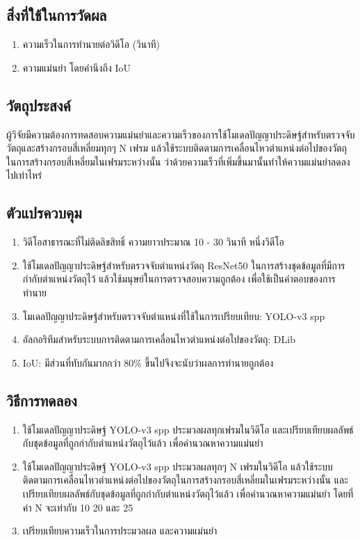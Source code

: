 \subsection*{สิ่งที่ใช้ในการวัดผล}
	\begin{enumerate}
		\setlength\itemsep{-0.25em}
		\item ความเร็วในการทำนายต่อวิดีโอ (วินาที)
		\item ความแม่นยำ โดยคำนึงถึง IoU
	\end{enumerate}
\subsection*{วัตถุประสงค์}
ผู้วิจัยมีความต้องการทดสอบความแม่นยำและความเร็วของการใช้โมเดลปัญญาประดิษฐ์สำหรับตรวจจับวัตถุและสร้างกรอบสี่เหลี่ยมทุกๆ N เฟรม 
แล้วใช้ระบบติดตามการเคลื่อนไหวตำแหน่งต่อไปของวัตถุในการสร้างกรอบสี่เหลี่ยมในเฟรมระหว่างนั้น ว่าด้วยความเร็วที่เพิ่มขึ้นมานั้นทำให้ความแม่นยำลดลงไปเท่าไหร่
\subsection*{ตัวแปรควบคุม}
	\begin{enumerate}
		\setlength\itemsep{-0.25em}
		\item วิดีโอสาธารณะที่ไม่ติดลิขสิทธิ์ ความยาวประมาณ 10 - 30 วินาที หนึ่งวิดีโอ
		\item ใช้โมเดลปัญญาประดิษฐ์สำหรับตรวจจับตำแหน่งวัตถุ ResNet50 ในการสร้างชุดข้อมูลที่มีการกำกับตำแหน่งวัตถุไว้ แล้วใช้มนุษย์ในการตรวจสอบความถูกต้อง
		เพื่อใช้เป็นคำตอบของการทำนาย
		\item โมเดลปัญญาประดิษฐ์สำหรับตรวจจับตำแหน่งที่ใช้ในการเปรียบเทียบ: YOLO-v3 spp
		\item อัลกอริทึมสำหรับระบบการติดตามการเคลื่อนไหวตำแหน่งต่อไปของวัตถุ: DLib
		\item IoU: มีส่วนที่ทับกันมากกว่า 80\% ขึ้นไปจึงจะนับว่าผลการทำนายถูกต้อง
	\end{enumerate}
\subsection*{วิธีการทดลอง}
	\begin{enumerate}
		\setlength\itemsep{-0.25em}
		\item ใช้โมเดลปัญญาประดิษฐ์ YOLO-v3 spp ประมวลผลทุกเฟรมในวิดีโอ และเปรียบเทียบผลลัพธ์กับชุดข้อมูลที่ถูกกำกับตำแหน่งวัตถุไว้แล้ว เพื่อคำนวณหาความแม่นยำ
		\item ใช้โมเดลปัญญาประดิษฐ์ YOLO-v3 spp ประมวลผลทุกๆ N เฟรมในวิดีโอ แล้วใช้ระบบติดตามการเคลื่อนไหวตำแหน่งต่อไปของวัตถุในการสร้างกรอบสี่เหลี่ยมในเฟรมระหว่างนั้น 
		และเปรียบเทียบผลลัพธ์กับชุดข้อมูลที่ถูกกำกับตำแหน่งวัตถุไว้แล้ว เพื่อคำนวณหาความแม่นยำ โดยที่ค่า N จะเท่ากับ 10 20 และ 25
		\item เปรียบเทียบความเร็วในการประมวลผล และความแม่นยำ
\end{enumerate}